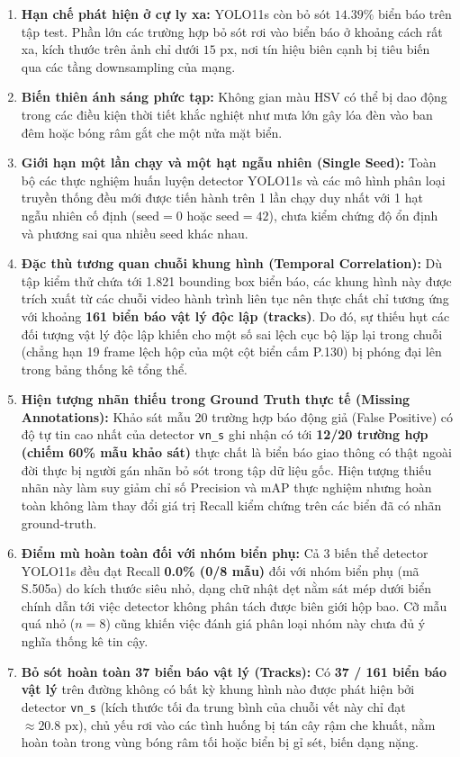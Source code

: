 \begin{enumerate}
    \item \textbf{Hạn chế phát hiện ở cự ly xa:} YOLO11s còn bỏ sót $14.39\%$ biển báo trên tập test. Phần lớn các trường hợp bỏ sót rơi vào biển báo ở khoảng cách rất xa, kích thước trên ảnh chỉ dưới $15\text{ px}$, nơi tín hiệu biên cạnh bị tiêu biến qua các tầng downsampling của mạng.
    \item \textbf{Biến thiên ánh sáng phức tạp:} Không gian màu HSV có thể bị dao động trong các điều kiện thời tiết khắc nghiệt như mưa lớn gây lóa đèn vào ban đêm hoặc bóng râm gắt che một nửa mặt biển.
    \item \textbf{Giới hạn một lần chạy và một hạt ngẫu nhiên (Single Seed):} Toàn bộ các thực nghiệm huấn luyện detector YOLO11s và các mô hình phân loại truyền thống đều mới được tiến hành trên 1 lần chạy duy nhất với 1 hạt ngẫu nhiên cố định ($\text{seed} = 0$ hoặc $\text{seed} = 42$), chưa kiểm chứng độ ổn định và phương sai qua nhiều seed khác nhau.
    \item \textbf{Đặc thù tương quan chuỗi khung hình (Temporal Correlation):} Dù tập kiểm thử chứa tới 1.821 bounding box biển báo, các khung hình này được trích xuất từ các chuỗi video hành trình liên tục nên thực chất chỉ tương ứng với khoảng \textbf{161 biển báo vật lý độc lập (tracks)}. Do đó, sự thiếu hụt các đối tượng vật lý độc lập khiến cho một số sai lệch cục bộ lặp lại trong chuỗi (chẳng hạn 19 frame lệch hộp của một cột biển cấm P.130) bị phóng đại lên trong bảng thống kê tổng thể.
    \item \textbf{Hiện tượng nhãn thiếu trong Ground Truth thực tế (Missing Annotations):} Khảo sát mẫu 20 trường hợp báo động giả (False Positive) có độ tự tin cao nhất của detector \texttt{vn\_s} ghi nhận có tới \textbf{12/20 trường hợp (chiếm 60\% mẫu khảo sát)} thực chất là biển báo giao thông có thật ngoài đời thực bị người gán nhãn bỏ sót trong tập dữ liệu gốc. Hiện tượng thiếu nhãn này làm suy giảm chỉ số Precision và mAP thực nghiệm nhưng hoàn toàn không làm thay đổi giá trị Recall kiểm chứng trên các biển đã có nhãn ground-truth.
    \item \textbf{Điểm mù hoàn toàn đối với nhóm biển phụ:} Cả 3 biến thể detector YOLO11s đều đạt Recall \textbf{0.0\% (0/8 mẫu)} đối với nhóm biển phụ (mã S.505a) do kích thước siêu nhỏ, dạng chữ nhật dẹt nằm sát mép dưới biển chính dẫn tới việc detector không phân tách được biên giới hộp bao. Cỡ mẫu quá nhỏ ($n=8$) cũng khiến việc đánh giá phân loại nhóm này chưa đủ ý nghĩa thống kê tin cậy.
    \item \textbf{Bỏ sót hoàn toàn 37 biển báo vật lý (Tracks):} Có \textbf{37 / 161 biển báo vật lý} trên đường không có bất kỳ khung hình nào được phát hiện bởi detector \texttt{vn\_s} (kích thước tối đa trung bình của chuỗi vết này chỉ đạt $\approx 20.8\text{ px}$), chủ yếu rơi vào các tình huống bị tán cây rậm che khuất, nằm hoàn toàn trong vùng bóng râm tối hoặc biển bị gỉ sét, biến dạng nặng.

\end{enumerate}
